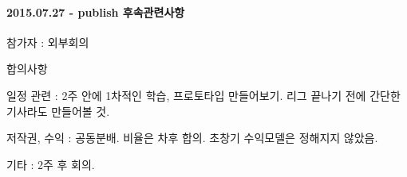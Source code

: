 \documentclass[twoside]{article}
\begin{document}
\paragraph{\textbf{2015.07.27} - publish 후속관련사항}
\begin{compactitem}
\item 참가자 : 외부회의 
\item 합의사항 
\begin{compactitem} 
\item 일정 관련 : 2주 안에 1차적인 학습, 프로토타입 만들어보기. 리그 끝나기 전에 간단한 기사라도 만들어볼 것. 
\item 저작권, 수익 : 공동분배. 비율은 차후 합의. 초창기 수익모델은 정해지지 않았음. 
\item 기타 : 2주 후 회의. 
\end{compactitem}
\end{compactitem}
\end{document}
